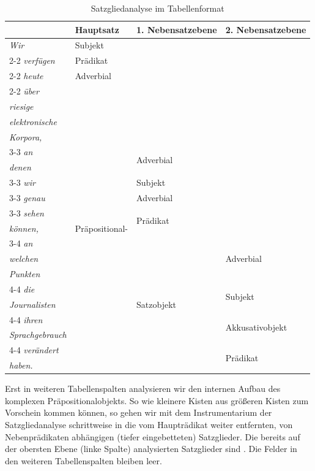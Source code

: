 \begin{table}
  \centering
  \begin{tabular}{l|l|l|l}
      & Hauptsatz & 1. Nebensatzebene & 2. Nebensatzebene\\
    \hline
    \textit{Wir} & Subjekt & & \\ \cline{2-2}
    \textit{verfügen} & Prädikat & & \\ \cline{2-2}
    \textit{heute} & Adverbial & & \\ \cline{2-2}
    \textit{über} & \multirow{19}{*}{Präpositional-} & &\\ 
    \textit{riesige} & \multirow{19}{*}{objekt}  & &\\ 
    \textit{elektronische} & & &\\ 
    \textit{Korpora,} & & &\\ \cline{3-3}
    \textit{an} & & \multirow{2}{*}{Adverbial} &\\
    \textit{denen} & & &\\  \cline{3-3}  
    \textit{wir} & & Subjekt &\\  \cline{3-3} 
    \textit{genau} &  & Adverbial & \\ \cline{3-3}  
    \textit{sehen} & & \multirow{2}{*}{Prädikat} & \\   
    \textit{können,} & & &\\ \cline{3-4} 
    \textit{an} & & \multirow{9}{*}{Satzobjekt} & \multirow{3}{*}{Adverbial} \\ 
    \textit{welchen} & & & \\ 
    \textit{Punkten} & & &\\ \cline{4-4}
    \textit{die} & & &\multirow{2}{*}{Subjekt} \\ 
    \textit{Journalisten} & & \\ \cline{4-4}
    \textit{ihren} & & & \multirow{2}{*}{Akkusativobjekt}\\ 
    \textit{Sprachgebrauch} & &\\ \cline{4-4} 
    \textit{verändert} & & & \multirow{2}{*}{Prädikat}\\ 
    \textit{haben.} & & &\\
    \hline
  \end{tabular}
  \caption{Satzgliedanalyse im Tabellenformat}
  \label{tab:SGATabelle}
\end{table}

Erst in weiteren Tabellenspalten analysieren wir den internen Aufbau des komplexen Präpositionalobjekts. So wie kleinere Kisten aus größeren Kisten zum Vorschein kommen können, so gehen wir mit dem Instrumentarium der Satzgliedanalyse schrittweise in die vom Haupträdikat weiter entfernten, von Nebenprädikaten abhängigen (tiefer eingebetteten) Satzglieder. Die bereits auf der obersten Ebene (linke Spalte) analysierten Satzglieder sind . Die Felder in den weiteren Tabellenspalten bleiben leer.

